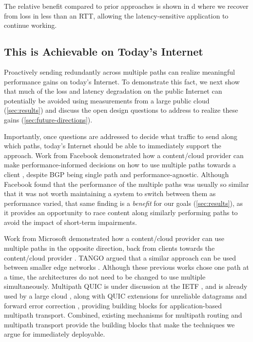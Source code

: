 \documentclass[sigconf,nonacm,screen,letterpaper,10pt]{acmart}
\begin{document}
The relative benefit compared to prior approaches is shown in
d where we recover from loss in
less than an RTT, allowing the latency-sensitive application to continue
working.

\hypertarget{this-is-achievable-on-todays-internet}{%
\subsection{This is Achievable on Today's
Internet}\label{this-is-achievable-on-todays-internet}}

Proactively sending redundantly across multiple paths can realize
meaningful performance gains on today's Internet. To demonstrate this
fact, we next show that much of the loss and latency degradation on the
public Internet can potentially be avoided using measurements from a
large public cloud (\cref{sec:results}) and discuss the open design
questions to address to realize these gains
(\cref{sec:future-directions}).

Importantly, once questions are addressed to decide what traffic to send
along which paths, today's Internet should be able to immediately
support the approach. Work from Facebook demonstrated how a
content/cloud provider can make performance-informed decisions on how to
use multiple paths towards a client \cite{brandon-facebook-imc}, despite
BGP being single path and performance-agnostic. Although Facebook found
that the performance of the multiple paths was usually so similar that
it was not worth maintaining a system to switch between them as
performance varied, that same finding is a \emph{benefit} for our goals
(\cref{sec:results}), as it provides an opportunity to race content
along similarly performing paths to avoid the impact of short-term
impairments.

Work from Microsoft demonstrated how a content/cloud provider can use
multiple paths in the opposite direction, back from clients towards the
content/cloud provider \cite{painter}. TANGO argued that a similar
approach can be used between smaller edge networks \cite{tango}.
Although these previous works chose one path at a time, the
architectures do not need to be changed to use multiple simultaneously.
Multipath QUIC \cite{mpquic-conext} is under discussion at the IETF
\cite{mpquic-rfc}, and is already used by a large cloud
\cite{alibaba-mpquic}, along with QUIC extensions for unreliable
datagrams \cite{quic-unreliable-datagrams-rfc} and forward error
correction \cite{quic-fec}, providing building blocks for
application-based multipath transport. Combined, existing mechanisms for
multipath routing and multipath transport provide the building blocks
that make the techniques we argue for immediately deployable.
\end{document}
